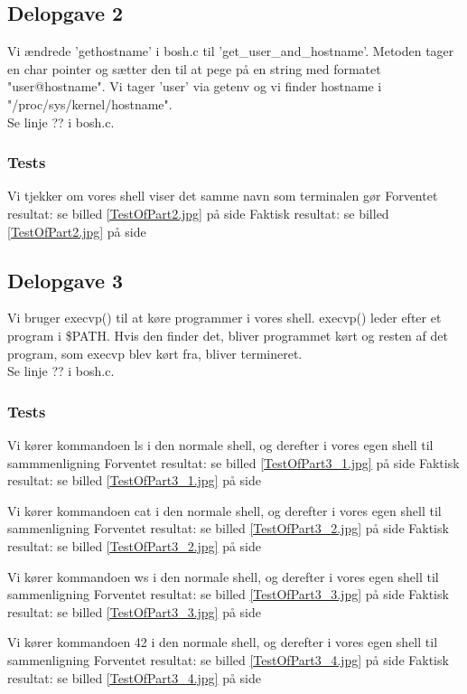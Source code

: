 \subsection{Delopgave 2}
Vi ændrede 'gethostname' i bosh.c til 'get\_user\_and\_hostname'. Metoden tager en char pointer og sætter den til at pege på en string med formatet "user@hostname". Vi tager 'user' via getenv og vi finder hostname i "/proc/sys/kernel/hostname".
\\Se linje ?? i bosh.c.
\subsubsection{Tests}
Vi tjekker om vores shell viser det samme navn som terminalen gør
Forventet resultat: se billed \ref{TestOfPart2.jpg} på side \pageref{Test2}
Faktisk resultat: se billed \ref{TestOfPart2.jpg} på side \pageref{Test2}

\subsection{Delopgave 3}
Vi bruger execvp() til at køre programmer i vores shell. execvp() leder efter et program i \$PATH. Hvis den finder det, bliver programmet kørt og resten af det program, som execvp blev kørt fra, bliver termineret. 
\\Se linje ?? i bosh.c.

\subsubsection{Tests}
Vi kører kommandoen ls i den normale shell, og derefter i vores egen shell til sammmenligning
Forventet resultat: se billed \ref{TestOfPart3_1.jpg} på side \pageref{Test3}
Faktisk resultat: se billed \ref{TestOfPart3_1.jpg} på side \pageref{Test3}

Vi kører kommandoen cat i den normale shell, og derefter i vores egen shell til sammenligning
Forventet resultat: se billed \ref{TestOfPart3_2.jpg} på side \pageref{Test3}
Faktisk resultat: se billed \ref{TestOfPart3_2.jpg} på side \pageref{Test3} 

Vi kører kommandoen ws i den normale shell, og derefter i vores egen shell til sammenligning
Forventet resultat: se billed \ref{TestOfPart3_3.jpg} på side \pageref{Test3}
Faktisk resultat: se billed \ref{TestOfPart3_3.jpg} på side \pageref{Test3} 

Vi kører kommandoen 42 i den normale shell, og derefter i vores egen shell til sammenligning
Forventet resultat: se billed \ref{TestOfPart3_4.jpg} på side \pageref{Test3}
Faktisk resultat: se billed \ref{TestOfPart3_4.jpg} på side \pageref{Test3} 

